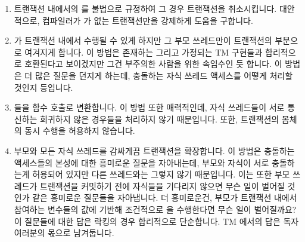 \begin{enumerate}
\item	트랜잭션 내에서의  를 불법으로 규정하여 그 경우
	트랜잭션을 취소시킵니다.
	대안적으로, 컴파일러가  가 없는 트랜잭션만을
	강제하게 도움을 구합니다.
\item	{} 가 트랜잭션 내에서 수행될 수 있게 하지만 그 부모
	쓰레드만이 트랜잭션의 부분으로 여겨지게 합니다.
	이 방법은 존재하는 그리고 가정되는 TM 구현들과 합리적으로 호환된다고
	보이겠지만 그건 부주의한 사람을 위한 속임수인 듯 합니다.
	이 방법은 더 많은 질문을 던지게 하는데, 충돌하는 자식 쓰레드 액세스를
	어떻게 처리할 것인지 등입니다.
\item	{} 들을 함수 호출로 변환합니다.
	이 방법 또한 매력적인데, 자식 쓰레드들이 서로 통신하는 희귀하지 않은
	경우들을 처리하지 않기 때문입니다.
	또한, 트랜잭션의 몸체의 동시 수행을 허용하지 않습니다.

\item	부모와 모든 자식 쓰레드를 감싸게끔 트랜잭션을 확장합니다.
	이 방법은 충돌하는 액세스들의 본성에 대한 흥미로운 질문을 자아내는데,
	부모와 자식이 서로 충돌하는게 허용되어 있지만 다른 쓰레드와는 그렇지
	않기 때문입니다.
	이는 또한 부모 쓰레드가 트랜잭션을 커밋하기 전에 자식들을 기다리지
	않으면 무슨 일이 벌어질 것인가 같은 흥미로운 질문들을 자아냅니다.
	더 흥미로운건, 부모가 트랜잭션 내에서 참여하는 변수들의 값에 기반해
	조건적으로  을 수행한다면 무슨 일이 벌어질까요? 
	이 질문들에 대한 답은 락킹의 경우 합리적으로 단순합니다.
	TM 에서의 답은 독자 여러분의 몫으로 남겨둡니다.


\end{enumerate}
